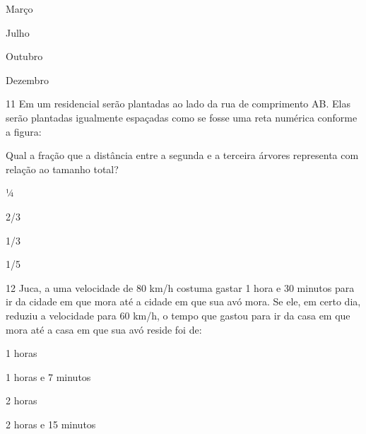 \begin{escolha}
\item
  Março
\item
  Julho
\item
  Outubro
\item
  Dezembro
\end{escolha}


\num{11} Em um residencial serão plantadas ao lado da rua de comprimento
AB. Elas serão plantadas igualmente espaçadas como se fosse uma reta
numérica conforme a figura:


Qual a fração que a distância entre a segunda e a terceira árvores
representa com relação ao tamanho total?

\begin{escolha}
\item
  ¼
\item
  2/3
\item
  1/3
\item
  1/5
\end{escolha}


\num{12} Juca, a uma velocidade de 80 km/h costuma gastar 1 hora e 30
minutos para ir da cidade em que mora até a cidade em que sua avó mora.
Se ele, em certo dia, reduziu a velocidade para 60 km/h, o tempo que
gastou para ir da casa em que mora até a casa em que sua avó reside foi
de:

\begin{escolha}
\item
  1 horas
\item
  1 horas e 7 minutos
\item
  2 horas
\item
  2 horas e 15 minutos
\end{escolha}

